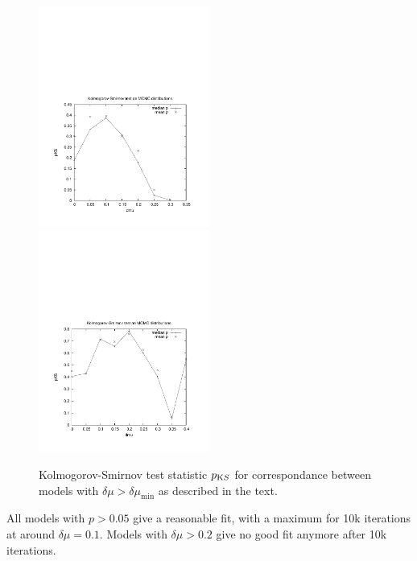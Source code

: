 \begin{figure}
    \begin{center}
        \hspace{-7mm}
        \includegraphics[width=0.5\textwidth]{fig/10kit.pdf}
        \includegraphics[width=0.5\textwidth]{fig/50kit.pdf}
        \caption{Kolmogorov-Smirnov test statistic $p_{\text KS}$ for
          correspondance between models with $\delta\mu>\delta\mu_{\min}$ as
          described in the text.}
        \label{fig:kit}
    \end{center}
\end{figure}


All models with $p>0.05$ give a reasonable fit, with a maximum for 10k
iterations at around $\delta \mu = 0.1$. Models with $\delta \mu>0.2$
give no good fit anymore after 10k iterations.

